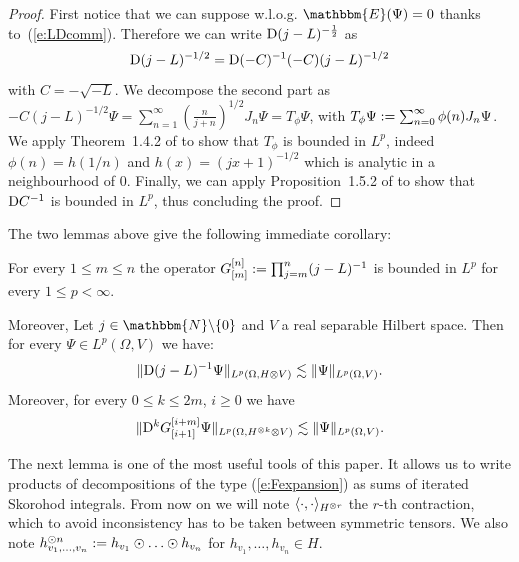 \begin{appendices}
\begin{proof}
  First notice that we can suppose w.l.o.g. $\mathbbm{E} (\Psi) = 0$ thanks
  to~(\ref{e:LDcomm}). Therefore we can write $\mathrm{D} (j - L)^{- \frac{1}{2}}$
  as
  \[ \mathrm{D} (j - L)^{- 1 / 2} = \mathrm{D} (- C)^{- 1} (- C)  (j - L)^{- 1 / 2} \]
  with $C = - \sqrt{- L}$. We decompose the second part as $- C (j - L)^{- 1
  / 2} \Psi = \sum_{n = 1}^{\infty} \left( \frac{n}{j + n} \right)^{1 / 2} J_n
  \Psi = T_{\phi} \Psi$, with $T_{\phi} \Psi := \sum_{n = 0}^{\infty}
  \phi (n) J_n \Psi$. We apply Theorem~1.4.2 of {\cite{nualart_2006}} to show
  that $T_{\phi}$ is bounded in $L^p$, indeed $\phi (n) = h (1 / n)$ and $h
  (x) = (jx + 1)^{- 1 / 2}$ which is analytic in a neighbourhood of 0.
  Finally, we can apply Proposition~1.5.2 of {\cite{nualart_2006}} to show
  that $\mathrm{D} C^{- 1}$ is bounded in $L^p$, thus concluding the proof.
\end{proof}

The two lemmas above give the following immediate corollary:

\begin{corollary}
  \label{l:bounded-q}For every $1 \leqslant m \leqslant n$ the operator
  $G_{[m]}^{[n]} := \prod_{j = m}^n (j - L)^{- 1}$ is bounded in $L^p$
  for every $1 \leqslant p < \infty$.
  
  Moreover, Let $j \in \mathbbm{N}\backslash \{ 0 \}$ and $V$ a real separable
  Hilbert space. Then for every $\Psi \in L^p (\Omega, V)$ we have:
  \[ \| \mathrm{D} (j - L)^{- 1} \Psi \|_{L^p (\Omega, H \otimes V)} \lesssim \|
     \Psi \|_{L^p (\Omega, V)} . \]
  Moreover, for every $0 \leqslant k \leqslant 2 m$, $i \geqslant 0$ we have
  \[ \| \mathrm{D}^k G_{[i + 1]}^{[i + m]} \Psi \|_{L^p (\Omega, H^{\otimes k}
     \otimes V)} \lesssim \| \Psi \|_{L^p (\Omega, V)} . \]
\end{corollary}

The next lemma is one of the most useful tools of this paper. It allows us to
write products of decompositions of the type (\ref{e:Fexpansion}) as sums of
iterated Skorohod integrals. From now on we will note $\langle \cdot,
\cdot \rangle_{H^{\otimes r}}$ the $r$-th contraction, which to avoid
inconsistency has to be taken between symmetric tensors. We also note
$h^{\odot n}_{v_1, \ldots, v_n} := h_{v_1} \odot \ldots \odot h_{v_n}$
for $h_{v_1}, \ldots, h_{v_n} \in H$.

\begin{lemma}
  \label{l:productformula}
  

\end{lemma}
\end{appendices}
